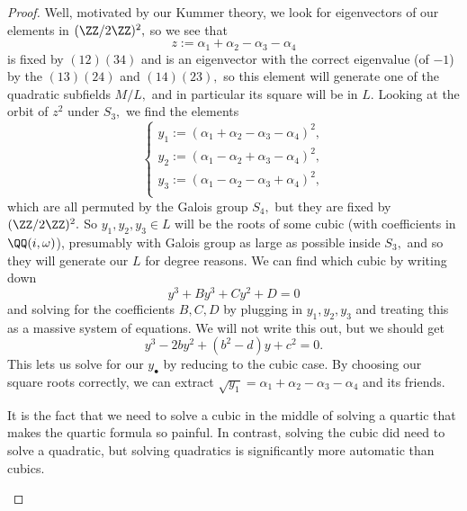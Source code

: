 \documentclass[../notes.tex]{subfiles}
\begin{document}
\begin{proof}
	Well, motivated by our Kummer theory, we look for eigenvectors of our elements in $(\ZZ/2\ZZ)^2,$ so we see that
	\[z:=\alpha_1+\alpha_2-\alpha_3-\alpha_4\]
	is fixed by $(12)(34)$ and is an eigenvector with the correct eigenvalue (of $-1$) by the $(13)(24)$ and $(14)(23),$ so this element will generate one of the quadratic subfields $M/L,$ and in particular its square will be in $L.$ Looking at the orbit of $z^2$ under $S_3,$ we find the elements
	\[\begin{cases}
		y_1:=(\alpha_1+\alpha_2-\alpha_3-\alpha_4)^2, \\
		y_2:=(\alpha_1-\alpha_2+\alpha_3-\alpha_4)^2, \\
		y_3:=(\alpha_1-\alpha_2-\alpha_3+\alpha_4)^2, \\
	\end{cases}\]
	which are all permuted by the Galois group $S_4,$ but they are fixed by $(\ZZ/2\ZZ)^2.$ So $y_1,y_2,y_3\in L$ will be the roots of some cubic (with coefficients in $\QQ(i,\omega)$), presumably with Galois group as large as possible inside $S_3,$ and so they will generate our $L$ for degree reasons. We can find which cubic by writing down
	\[y^3+By^3+Cy^2+D=0\]
	and solving for the coefficients $B,C,D$ by plugging in $y_1,y_2,y_3$ and treating this as a massive system of equations. We will not write this out, but we should get
	\[y^3-2by^2+\left(b^2-d\right)y+c^2=0.\]
	This lets us solve for our $y_\bullet$ by reducing to the cubic case. By choosing our square roots correctly, we can extract $\sqrt{y_1}=\alpha_1+\alpha_2-\alpha_3-\alpha_4$ and its friends.
	\begin{remark}[Nir]
		It is the fact that we need to solve a cubic in the middle of solving a quartic that makes the quartic formula so painful. In contrast, solving the cubic did need to solve a quadratic, but solving quadratics is significantly more automatic than cubics.
	\end{remark}
	

\end{proof}
\end{document}
